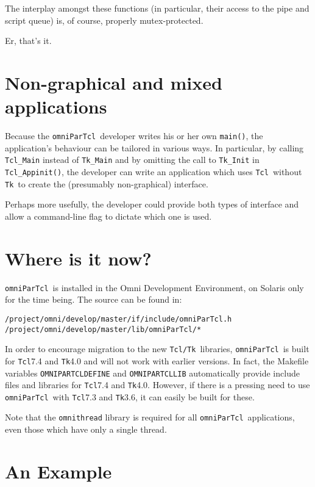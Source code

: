 \documentclass[11pt]{article}
\def\omniParTcl{{\tt omniParTcl}}
\def\tcltk{{\tt Tcl/Tk}}
\def\tcl{{\tt Tcl}}
\def\tk{{\tt Tk}}
\begin{document}
\noindent
The interplay amongst these functions (in particular, their access
to the pipe and script queue) is, of course, properly mutex-protected.

Er, that's it.

\section{Non-graphical and mixed applications}

Because the \omniParTcl\ developer writes his or her own {\tt main()},
the application's behaviour can be tailored in various ways.  In
particular, by calling {\tt Tcl\_Main} instead of {\tt Tk\_Main}
and by omitting the call to {\tt Tk\_Init} in 
{\tt Tcl\_Appinit()}, the developer can write an application which
uses \tcl\ without \tk\ to create the (presumably non-graphical) interface.

Perhaps more usefully, the developer could provide both types of interface
and allow a command-line flag to dictate which one is used.  

\section{Where is it now?}

\omniParTcl\ is installed in the Omni Development Environment,
on Solaris only for the time being.  The source can be found in:

\begin{verbatim}
/project/omni/develop/master/if/include/omniParTcl.h
/project/omni/develop/master/lib/omniParTcl/*
\end{verbatim}

In order to encourage migration to the new \tcltk\ libraries,
\omniParTcl\ is built for \tcl 7.4 and \tk 4.0 and will not
work with earlier versions.  In fact, the Makefile variables 
{\tt OMNIPARTCLDEFINE} and {\tt OMNIPARTCLLIB} automatically provide include
files and libraries for \tcl 7.4 and \tk 4.0.  However, if there is a
pressing need to use \omniParTcl\ with \tcl 7.3 and \tk 3.6, it can
easily be built for these.

Note that the {\tt omnithread} library is required for all \omniParTcl\
applications, even those which have only a single thread.

\section{An Example}
\end{document}
